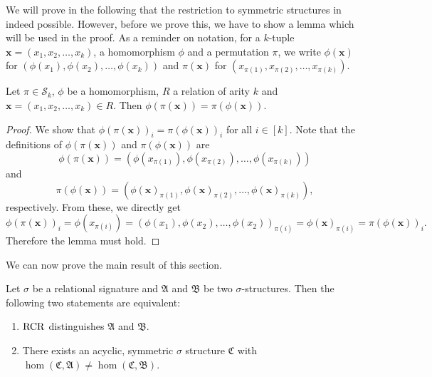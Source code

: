 We will prove in the following that the restriction to symmetric structures in indeed possible.
However, before we prove this, we have to show a lemma which will be used in the proof.
As a reminder on notation, for a $k$-tuple $\mathbf x=(x_1,x_2,\dots,x_k)$, a homomorphism $\phi$ and a permutation $\pi$, we write $\phi(\mathbf x)$ for $(\phi(x_1),\phi(x_2),\dots,\phi(x_k))$ and $\pi(\mathbf x)$ for $(x_{\pi(1)},x_{\pi(2)},\dots,x_{\pi(k)})$.
\begin{lemma}
	Let $\pi\in\mathcal S_k$, $\phi$ be a homomorphism, $R$ a relation of arity $k$ and $\mathbf x=(x_1,x_2,\dots,x_k)\in R$.
	Then $\phi(\pi(\mathbf x))=\pi(\phi(\mathbf x))$.
	\label{HomAndPermutCommute}
\end{lemma}
\begin{proof}
	We show that $\phi(\pi(\mathbf x))_i=\pi(\phi(\mathbf x))_i$ for all $i\in [k]$.
	Note that the definitions of $\phi(\pi(\mathbf x))$ and $\pi(\phi(\mathbf x))$ are 
	$$\phi(\pi(\mathbf x)) = (\phi(x_{\pi(1)}), \phi(x_{\pi(2)}),\dots,\phi(x_{\pi(k)}))$$
	and
	$$\pi(\phi(\mathbf x)) = (\phi(\mathbf x)_{\pi(1)},\phi(\mathbf x)_{\pi(2)},\dots,\phi(\mathbf x)_{\pi(k)}),$$
	respectively.
	From these, we directly get
	$$\phi(\pi(\mathbf x))_i=\phi(x_{\pi(i)})=(\phi(x_1),\phi(x_2),\dots,\phi(x_2))_{\pi(i)}=\phi(\mathbf x)_{\pi(i)}=\pi(\phi(\mathbf x))_i.$$
	Therefore the lemma must hold.
\end{proof}
We can now prove the main result of this section.
\begin{theorem}
	\label{thm:ThmD}
	Let $\sigma$ be a relational signature and $\mathfrak A$ and $\mathfrak B$ be two $\sigma$-structures.
	Then the following two statements are equivalent:
	\begin{enumerate}
		\item $\operatorname{RCR}$ distinguishes $\mathfrak A$ and $\mathfrak B$.
		\item There exists an acyclic, symmetric $\sigma$ structure $\mathfrak C$ with $\hom(\mathfrak C,\mathfrak A)\neq \hom(\mathfrak C,\mathfrak B)$.
	\end{enumerate}
\end{theorem}
